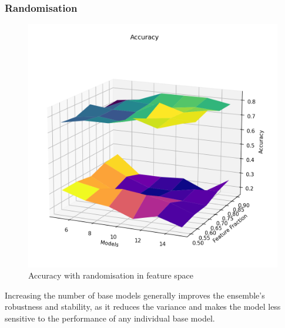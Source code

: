 \subsubsection{Randomisation}
\begin{figure}[h]
	\centering
	\includegraphics[width=0.8\linewidth]{Ressources/Q3_acc_f.png}
	
	\caption{Accuracy with randomisation in feature space}
	\label{fig:Q3_acc_f}
\end{figure}
Increasing the number of base models generally improves the ensemble’s robustness and stability, as it reduces the variance and makes the model less sensitive to the performance of any individual base model.